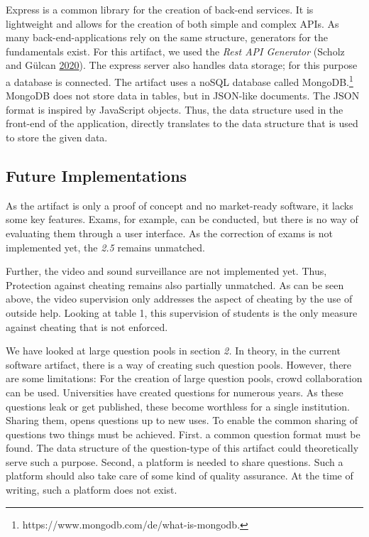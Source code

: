 Express is a common library for the creation of back-end services. It is
lightweight and allows for the creation of both simple and complex APIs.
As many back-end-applications rely on the same structure, generators for
the fundamentals exist. For this artifact, we used the \emph{Rest API
Generator} (Scholz and Gülcan \protect\hyperlink{ref-Scholz}{2020}). The
express server also handles data storage; for this purpose a database is
connected. The artifact uses a noSQL database called MongoDB.\footnote{https://www.mongodb.com/de/what-is-mongodb.}
MongoDB does not store data in tables, but in JSON-like documents. The
JSON format is inspired by JavaScript objects. Thus, the data structure
used in the front-end of the application, directly translates to the
data structure that is used to store the given data.

\hypertarget{future-implementations}{%
\subsection{Future Implementations}\label{future-implementations}}

As the artifact is only a proof of concept and no market-ready software,
it lacks some key features. Exams, for example, can be conducted, but
there is no way of evaluating them through a user interface. As the
correction of exams is not implemented yet, the \emph{2.5} remains
unmatched.

Further, the video and sound surveillance are not implemented yet. Thus,
Protection against cheating remains also partially unmatched. As can be
seen above, the video supervision only addresses the aspect of cheating
by the use of outside help. Looking at table 1, this supervision of
students is the only measure against cheating that is not enforced.

We have looked at large question pools in section \emph{2.} In theory,
in the current software artifact, there is a way of creating such
question pools. However, there are some limitations: For the creation of
large question pools, crowd collaboration can be used. Universities have
created questions for numerous years. As these questions leak or get
published, these become worthless for a single institution. Sharing
them, opens questions up to new uses. To enable the common sharing of
questions two things must be achieved. First. a common question format
must be found. The data structure of the question-type of this artifact
could theoretically serve such a purpose. Second, a platform is needed
to share questions. Such a platform should also take care of some kind
of quality assurance. At the time of writing, such a platform does not
exist.


